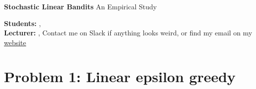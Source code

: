 


\usepackage{listings}
\usepackage{xcolor}



\begin{Large}
    \textsf{\textbf{Stochastic Linear Bandits}}
    An Empirical Study
\end{Large}

\vspace{1ex}

\textsf{\textbf{Students:}} , \\
\textsf{\textbf{Lecturer:}} , Contact me on Slack if anything looks weird, or find my email on my \href{www.cvernade.com}{website} 

\section{Problem 1: Linear epsilon greedy}

